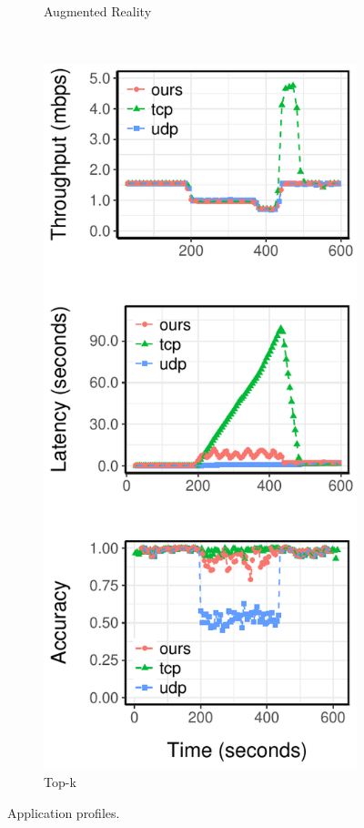 \begin{figure}
\begin{subfigure}[t]{0.33\textwidth}
    \caption{Augmented Reality}
    \label{fig:ar-runtime}
  \end{subfigure}
  ~
  \begin{subfigure}[t]{0.33\textwidth}
    \centering
    \includegraphics[width=\textwidth]{figures/topk-runtime-verticle.pdf}
    \caption{Top-k}
    \label{fig:tk-runtime}
  \end{subfigure}
  \caption{Application profiles.}
  \label{fig:all-runtime}
\end{figure}


